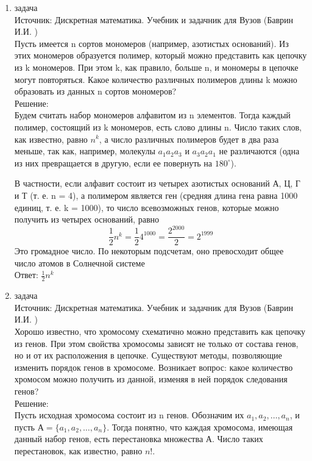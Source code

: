 \documentclass[a4paper,14pt]{extreport} %
\begin{document}
\begin{center}
\begin{enumerate}
						\item {\large задача  }\\
						Источник:  Дискретная математика. Учебник и задачник для Вузов (Баврин И.И. )\\
						\vspace{15pt}
						Пусть имеется n сортов мономеров (например, азотистых оснований). Из этих мономеров образуется полимер, который можно представить как цепочку из k мономеров. При этом k, как правило, больше n, и мономеры в цепочке могут повторяться.
						Какое количество различных полимеров длины k можно образовать из данных n сортов мономеров?
						\\
						\vspace{15pt}
						Решение:\\
						Будем считать набор мономеров алфавитом из n элементов. Тогда каждый полимер, состоящий из k мономеров, есть слово длины n. Число таких слов, как известно, равно $n^k$, а число различных полимеров будет в два раза меньше, так как, например, молекулы $a_1a_2a_3$ и $a_3a_2a_1$ не различаются (одна из них превращается в другую, если ее повернуть на $180^{\circ}$).
						
						В частности, если алфавит состоит из четырех азотистых оснований А, Ц, Г и Т (т. е. n = 4), а полимером является ген (средняя длина гена равна 1000 единиц, т. е. k = 1000), то число всевозможных генов, которые можно получить из четырех оснований, равно
						\begin{equation}
							\frac{1}{2}n^k=\frac{1}{2}4^{1000} = \frac{2^{2000}}{2} = 2^{1999}
						\end{equation}
						Это громадное число. По некоторым подсчетам, оно превосходит общее число атомов в Солнечной системе\\
						Ответ: $\frac{1}{2}n^k$
						
						 \item {\large задача  }\\
						Источник:  Дискретная математика. Учебник и задачник для Вузов (Баврин И.И. )\\
						\vspace{15pt}
						Хорошо известно, что хромосому схематично можно представить как цепочку из генов. При этом свойства хромосомы зависят не только от состава генов, но и от их расположения в цепочке. Существуют методы, позволяющие изменить порядок генов в хромосоме. Возникает вопрос: какое количество хромосом можно получить из данной, изменяя в ней порядок следования генов?\\
						\vspace{15pt}
						Решение:\\
						Пусть исходная хромосома состоит из n генов. Обозначим их $a_1, a_2,\ldots, a_n$, и пусть  $А = \{a_1, a_2,\ldots, a_n\}$. Тогда понятно, что каждая хромосома, имеющая данный набор генов, есть перестановка множества А. Число таких перестановок, как известно, равно $n!$.
						

\end{enumerate}
\end{center}
\end{document}
